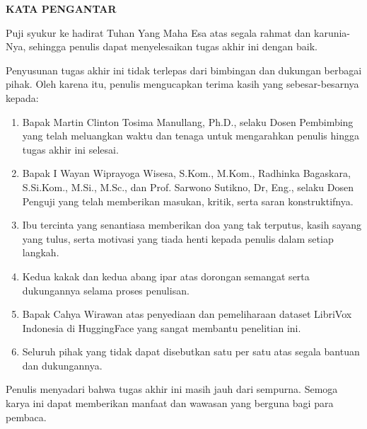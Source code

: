 \clearpage
{}%

\begin{justifying}
	\large \bfseries \centering \MakeUppercase{Kata Pengantar}\linebreak
	
	\normalsize \normalfont \justifying
	Puji syukur ke hadirat Tuhan Yang Maha Esa atas segala rahmat dan karunia-Nya, sehingga penulis dapat menyelesaikan tugas akhir ini dengan baik.
    
    Penyusunan tugas akhir ini tidak terlepas dari bimbingan dan dukungan berbagai pihak. Oleh karena itu, penulis mengucapkan terima kasih yang sebesar-besarnya kepada:
    \begin{enumerate}
        \item Bapak Martin Clinton Tosima Manullang, Ph.D., selaku Dosen Pembimbing yang telah meluangkan waktu dan tenaga untuk mengarahkan penulis hingga tugas akhir ini selesai.
        \item Bapak I Wayan Wiprayoga Wisesa, S.Kom., M.Kom., Radhinka Bagaskara, S.Si.Kom., M.Si., M.Sc., dan Prof. Sarwono Sutikno, Dr, Eng., selaku Dosen Penguji yang telah memberikan masukan, kritik, serta saran konstruktifnya.
        \item Ibu tercinta yang senantiasa memberikan doa yang tak terputus, kasih sayang yang tulus, serta motivasi yang tiada henti kepada penulis dalam setiap langkah.
        \item Kedua kakak dan kedua abang ipar atas dorongan semangat serta dukungannya selama proses penulisan.
        \item Bapak Cahya Wirawan atas penyediaan dan pemeliharaan dataset LibriVox Indonesia di HuggingFace yang sangat membantu penelitian ini.
        \item Seluruh pihak yang tidak dapat disebutkan satu per satu atas segala bantuan dan dukungannya.
    \end{enumerate} 
    
    Penulis menyadari bahwa tugas akhir ini masih jauh dari sempurna. Semoga karya ini dapat memberikan manfaat dan wawasan yang berguna bagi para pembaca.
	
\end{justifying}
\clearpage